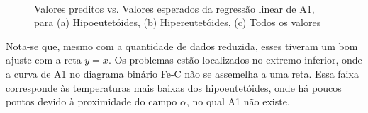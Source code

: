 \documentclass[brazil,tf,epusp]{usp}  %
\begin{document}
\begin{figure}[!h]
\hfill
{}\\
\caption{Valores preditos vs. Valores esperados da regressão linear de A1, para (a) Hipoeutetóides, (b) Hipereutetóides, (c) Todos os valores}
\label{fig:LR_A1}
\end{figure}

Nota-se que, mesmo com a quantidade de dados reduzida, esses tiveram um bom ajuste com a reta $y = x$. Os problemas estão localizados no extremo inferior, onde a curva de A1 no diagrama binário Fe-C não se assemelha a uma reta. Essa faixa corresponde às temperaturas mais baixas dos hipoeutetóides, onde há poucos pontos devido à proximidade do campo $\alpha$, no qual A1 não existe.
\end{document}
